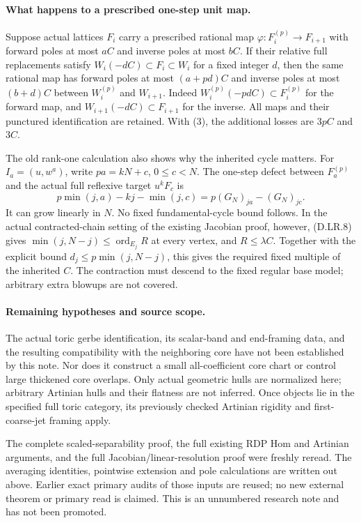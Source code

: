 \paragraph{What happens to a prescribed one-step unit map.}
Suppose actual lattices $F_i$ carry a prescribed rational map
$\varphi:F_i^{(p)}\to F_{i+1}$ with forward poles at most $aC$ and
inverse poles at most $bC$. If their relative full replacements satisfy
$W_i(-dC)\subset F_i\subset W_i$ for a fixed integer $d$, then the
same rational map has forward poles at most $(a+pd)C$ and inverse poles
at most $(b+d)C$ between $W_i^{(p)}$ and $W_{i+1}$.
Indeed $W_i^{(p)}(-pdC)\subset F_i^{(p)}$ for the forward map, and
$W_{i+1}(-dC)\subset F_{i+1}$ for the inverse. All maps and their
punctured identification are retained. With (3), the additional losses
are $3pC$ and $3C$.

The old rank-one calculation also shows why the inherited cycle matters.
For $I_a=(u,w^a)$, write $pa=kN+c$, $0\le c<N$. The one-step defect
between $F_a^{(p)}$ and the actual full reflexive target $u^kF_c$ is
\[
       p\min(j,a)-kj-\min(j,c)=p(G_N)_{ja}-(G_N)_{jc}.
\]
It can grow linearly in $N$. No fixed fundamental-cycle bound follows.
In the actual contracted-chain setting of the existing Jacobian proof,
however, (D.LR.8) gives $\min(j,N-j)\le\operatorname{ord}_{E_j}R$
at every vertex, and $R\le\lambda C$. Together with the explicit
bound $d_j\le p\min(j,N-j)$, this gives the required fixed multiple
of the inherited $C$. The contraction must descend to the fixed
regular base model; arbitrary extra blowups are not covered.

\paragraph{Remaining hypotheses and source scope.}
The actual toric gerbe identification, its scalar-band and end-framing
data, and the resulting compatibility with the neighboring core have
not been established by this note. Nor does it construct a small
all-coefficient core chart or control large thickened core overlaps.
Only actual geometric hulls are normalized here; arbitrary Artinian
hulls and their flatness are not inferred. Once objects lie in the
specified full toric category, its previously checked Artinian rigidity
and first-coarse-jet framing apply.

The complete scaled-separability proof, the full existing RDP Hom and
Artinian arguments, and the full Jacobian/linear-resolution proof were
freshly reread. The averaging identities, pointwise extension and pole
calculations are written out above. Earlier exact primary audits of
those inputs are reused; no new external theorem or primary read is
claimed. This is an unnumbered research note and has not been promoted.

